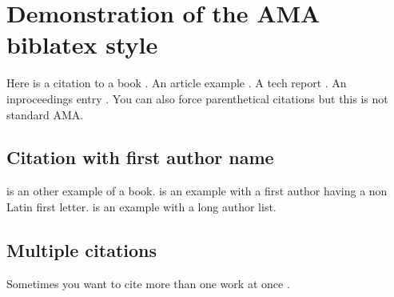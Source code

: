 \documentclass[a4paper,12pt]{article}
\begin{document}
\section*{Demonstration of the AMA biblatex style}

Here is a citation to a book \cite{whole-collection}.  
An article example \cite{article-minimal}.  
A tech report \cite{techreport-minimal}.  
An inproceedings entry \cite{inproceedings-full}.
You can also force parenthetical citations \parencite{techreport-minimal} but this is not standard AMA.

\subsection*{Citation with first author name}
\textcite{Lamport:Book:1989} is an other example of a book.
\textcite{Smigoc:FRONTNEURO:2023} is an example with a first author having a non Latin first letter.
\textcite{Byoun:CNN:2016} is an example with a long author list. 

\subsection*{Multiple citations}
Sometimes you want to cite more than one work at once \cite{Byoun:CNN:2016,article-minimal,techreport-minimal,whole-collection,Muirhead:NeurosurgRev:2021}.

\printbibliography
\end{document}
